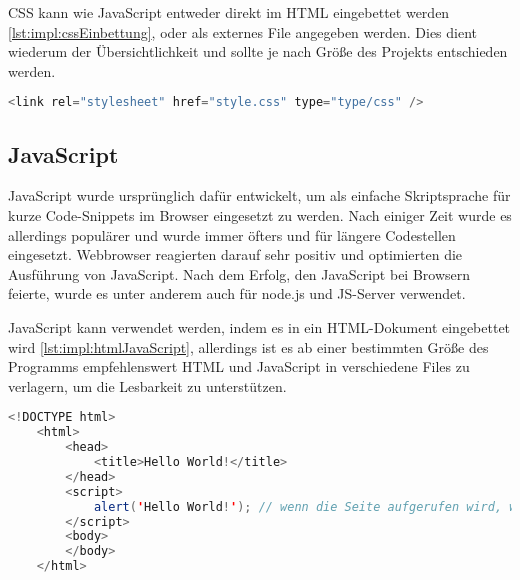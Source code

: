 CSS kann wie JavaScript entweder direkt im HTML eingebettet werden \ref{lst:impl:cssEinbettung}, oder als externes File angegeben werden. Dies dient wiederum der Übersichtlichkeit und sollte je nach Größe des Projekts entschieden werden.
 
\begin{lstlisting}[language=java,caption=CSS Einbettung,label=lst:impl:cssEinbettung]
    <link rel="stylesheet" href="style.css" type="type/css" />
\end{lstlisting}
 
\subsection{JavaScript}
JavaScript wurde ursprünglich dafür entwickelt, um als einfache Skriptsprache für kurze Code-Snippets im Browser eingesetzt zu werden. Nach einiger Zeit wurde es allerdings populärer und wurde immer öfters und für längere Codestellen eingesetzt. Webbrowser reagierten darauf sehr positiv und optimierten die Ausführung von JavaScript. Nach dem Erfolg, den JavaScript bei Browsern feierte, wurde es unter anderem auch für node.js und JS-Server verwendet.
 
JavaScript kann verwendet werden, indem es in ein HTML-Dokument eingebettet wird \ref{lst:impl:htmlJavaScript}, allerdings ist es ab einer bestimmten Größe des Programms empfehlenswert HTML und JavaScript in verschiedene Files zu verlagern, um die Lesbarkeit zu unterstützen.
 
\begin{lstlisting}[language=java,caption=HTML mit eingebettetem JavaScript,label=lst:impl:htmlJavaScript]
    <!DOCTYPE html>
    <html>
        <head>
            <title>Hello World!</title>
        </head>
        <script>
            alert('Hello World!'); // wenn die Seite aufgerufen wird, wird mithilfe von JavaScript ein Alert-Fenster mit 'Hello World!' ausgegeben
        </script>
        <body>
        </body>
    </html>
\end{lstlisting}